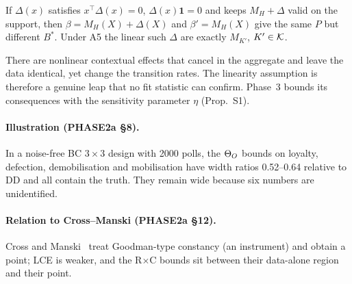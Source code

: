 \begin{result}\label{res:p2a-p9}
 If $\Delta(x)$ satisfies $x^\top\Delta(x)=0$, $\Delta(x)\mathbf
1=0$ and keeps $M_H+\Delta$ valid on the support, then $\beta=M_H(X)+\Delta(X)$
and $\beta'=M_H(X)$ give the same $P$ but different $B^*$. Under A5 the linear
such $\Delta$ are exactly $M_{K'}$, $K'\in\mathcal K$.
\end{result}
\begin{plain}
There are nonlinear contextual effects that cancel in the aggregate and leave
the data identical, yet change the transition rates. The linearity assumption is
therefore a genuine leap that no fit statistic can confirm. Phase~3 bounds its
consequences with the sensitivity parameter $\eta$ (Prop.~S1).
\end{plain}

\paragraph{Illustration (PHASE2a \S8).} In a noise-free BC $3\times3$ design with
2000 polls, the $\Theta_O$ bounds on loyalty, defection, demobilisation and
mobilisation have width ratios 0.52--0.64 relative to DD and all contain the
truth. They remain wide because six numbers are unidentified.

\paragraph{Relation to Cross--Manski (PHASE2a \S12).} Cross and
Manski~\citep{crossmanski2002} treat Goodman-type constancy (an instrument) and
obtain a point; LCE is weaker, and the R$\times$C bounds sit between their
data-alone region and their point.
